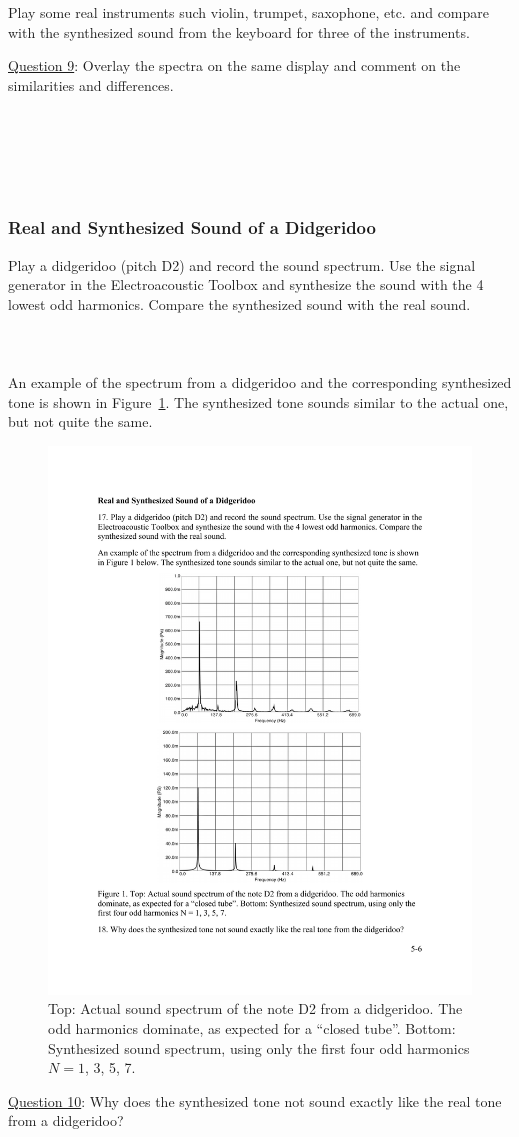 \documentclass[11pt]{NSF}
\begin{document}
Play some real instruments such violin, trumpet, saxophone, etc. and compare with the
synthesized sound from the keyboard for three of the instruments. 

\underline{Question 9}: Overlay the spectra on the same display and comment on the similarities and differences.
\\
\\
\\
\\
\\
\\

\subsubsection{Real and Synthesized Sound of a Didgeridoo}

Play a didgeridoo (pitch D2) and record the sound spectrum. Use the signal generator in the
Electroacoustic Toolbox and synthesize the sound with the 4 lowest odd harmonics. Compare the
synthesized sound with the real sound. 
\\
\\
\\
\\

An example of the spectrum from a didgeridoo and the 
corresponding synthesized tone is shown in Figure~\ref{f:1}. 
The synthesized tone sounds similar to the actual one, but not quite the same.
%
\begin{figure}[hbtp]
\begin{center}
\includegraphics[width=.7\textwidth]{fig5_1}
\caption{Top: Actual sound spectrum of the note D2 from a didgeridoo. 
The odd harmonics dominate, as expected for a ``closed tube”. 
Bottom: Synthesized sound spectrum, using only the first four odd harmonics 
$N = 1$, 3, 5, 7.}
\label{f:1} 
\end{center} 
\end{figure}
%


\underline{Question 10}: Why does the synthesized tone not sound
exactly like the real tone from a didgeridoo?
\\
\\
\\
\end{document}

